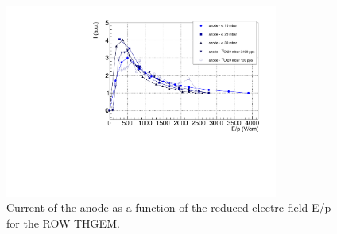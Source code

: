 \documentclass[a4paper, 11 pt]{report}
\begin{document}
  \begin{figure}[htbp]
	\centering
	\includegraphics[width=0.8\textwidth]{Immagini/driftScan_ROW_THGEM_comp_F.pdf}
	\caption{Current of the anode as a function of the reduced electrc field E/p for the 
	ROW THGEM.}
	\label{fig:driftScan_withbeam_F}
  \end{figure}
\end{document}
